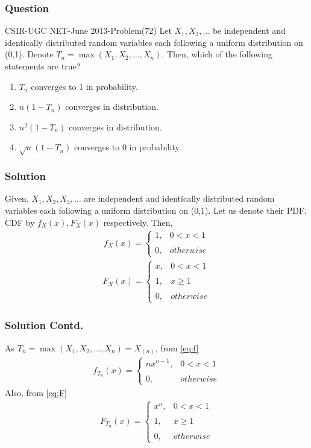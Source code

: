 \documentclass{beamer}
\providecommand{\brak}[1]{\ensuremath{\left(#1\right)}}
\begin{document}
\begin{frame}
\frametitle{Question}
\begin{block}{CSIR-UGC NET-June 2013-Problem(72)}
Let $X_{1},X_{2},\dots$ be independent and identically distributed random variables each following a uniform distribution on (0,1). Denote $T_{n}=\max\brak{ X_{1},X_{2},\dots,X_{n}}$. Then, which of the following statements are true?
\begin{enumerate}
    \item $T_{n}$ converges to 1 in probability.
    \item $n(1-T_{n})$ converges in distribution.
    \item $n^{2}(1-T_{n})$ converges in distribution.
    \item $\sqrt{n}(1-T_{n})$ converges to 0 in probability.
\end{enumerate}
\end{block}
\end{frame}

\begin{frame}
\frametitle{Solution}
Given, $X_{1},X_{2},X_{3},\dots$ are independent and identically distributed random variables each following a uniform distribution on (0,1). Let us denote their PDF, CDF by $f_{X}(x),F_{X}(x)$ respectively. Then,
\begin{align}
    f_{X}(x)=\begin{cases}
	1, & 0< x<1 \\~\\[-1em]
	0, & otherwise
	\end{cases} 
\end{align}
\begin{align}
	F_{X}(x)=\begin{cases}
	x, & 0< x<1 \\~\\[-1em]
	1, & x\geq 1\\~\\[-1em]
	0, & otherwise
	\end{cases} 
\end{align}
\end{frame}

\begin{frame}
\frametitle{Solution Contd.}
As $T_{n}=\max\brak{X_{1},X_{2},\dots,X_{n}}=X_{(n)}$, from \eqref{eq:f}
\begin{align}
    f_{T_{n}}(x)=\begin{cases}
	nx^{n-1}, & 0< x<1 \\~\\[-1em]
	0, & otherwise
	\end{cases} 
\end{align}
Also, from \eqref{eq:F}
\begin{align}
	F_{T_{n}}(x)=\begin{cases}
	x^{n}, & 0< x<1 \\~\\[-1em]
	1, & x\geq 1\\~\\[-1em]
	0, & otherwise
	\end{cases} 
\end{align}
\end{frame}
\end{document}
